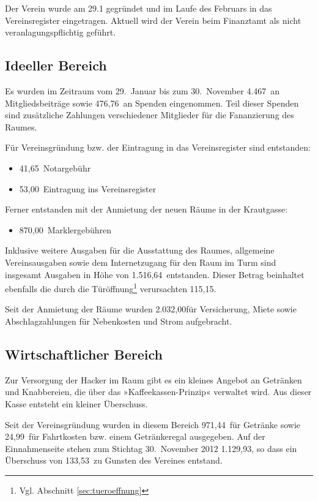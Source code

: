 \documentclass[10pt,DIV16]{scrartcl}
\begin{document}
Der Verein wurde am 29.1 gegründet und im Laufe des Februars in das 
Vereinsregister eingetragen. Aktuell wird der Verein beim Finanztamt 
als nicht veranlagungspflichtig geführt.

\subsection{Ideeller Bereich} 

Es wurden im Zeitraum vom 29.~Januar bis zum 30.~November 4.467\EUR\ 
an Mitgliedsbeiträge sowie 476,76\EUR\ an Spenden eingenommen. Teil 
dieser Spenden sind zusätzliche Zahlungen verschiedener Mitglieder 
für die Fananzierung des Raumes. 

Für Vereinsgründung bzw. der Eintragung in das Vereinsregister sind 
entstanden: 

\begin{itemize}
	\item 41,65\EUR\ Notargebühr
	\item 53,00\EUR\ Eintragung ins Vereinsregister
\end{itemize}

\noindent{} Ferner entstanden mit der Anmietung der neuen Räume in 
der Krautgasse:

\begin{itemize}
	\item 870,00\EUR\ Marklergebühren
\end{itemize}

Inklusive weitere Ausgaben für die Ausstattung des Raumes, 
allgemeine Vereinsausgaben sowie dem Internetzugang für den Raum im 
Turm sind insgesamt Ausgaben in Höhe von 1.516,64\EUR\ entstanden. 
Dieser Betrag beinhaltet ebenfalls die durch die Türöffnung\footnote
{Vgl. Abschnitt \ref{sec:tueroeffnung}} verursachten 115,15\EUR.

Seit der Anmietung der Räume wurden 2.032,00\EUR für Versicherung, 
Miete sowie Abschlagzahlungen für Nebenkosten und Strom aufgebracht. 

\subsection{Wirtschaftlicher Bereich}

Zur Versorgung der Hacker im Raum gibt es ein kleines Angebot an 
Getränken und Knabbereien, die über das »Kaffeekassen-Prinzip« 
verwaltet wird. Aus dieser Kasse entsteht ein kleiner Überschuss. 

Seit der Vereinsgründung wurden in diesem Bereich 971,44\EUR\ für 
Getränke sowie 24,99\EUR\ für Fahrtkosten bzw. einem Getränkeregal 
ausgegeben. Auf der Einnahmenseite stehen zum Stichtag 30.~November 
2012 1.129,93\EUR, so dass ein Überschuss von 133,53\EUR\ zu Gunsten 
des Vereines entstand. 
\end{document}
